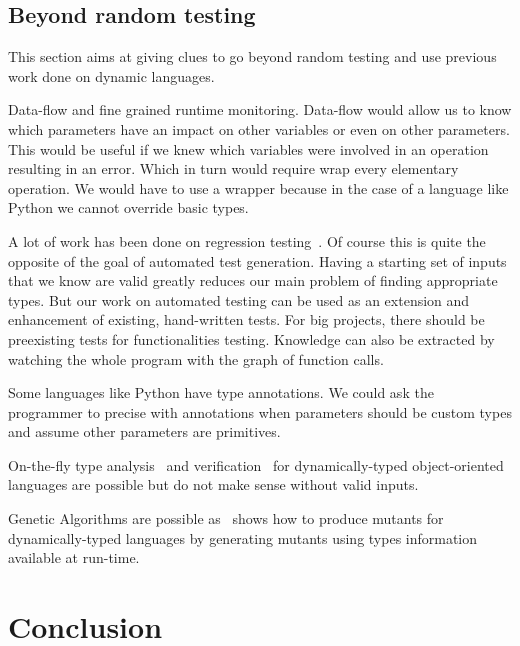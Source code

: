 \documentclass{llncs2e/llncs}
\begin{document}

\subsection{Beyond random testing}

This section aims at giving clues to go beyond random testing and use previous
work done on dynamic languages.

Data-flow and fine grained runtime monitoring. Data-flow would allow us to know
which parameters have an impact on other variables or even on other parameters.
This would be useful if we knew which variables were involved in an operation
resulting in an error. Which in turn would require wrap every elementary
operation. We would have to use a wrapper because in the case of a language like
Python we cannot override basic types.

A lot of work has been done on regression
testing~\cite{gligoric2011smutant,haupt2011type,steinert2010continuous,yoo2012regression}.
Of course this is quite the opposite of the goal of automated test generation.
Having a starting set of inputs that we know are valid greatly reduces our main
problem of finding appropriate types. But our work on automated testing can be
used as an extension and enhancement of existing, hand-written tests.
For big projects, there should be preexisting tests for functionalities testing.
Knowledge can also be extracted by watching the whole program with the graph of
function calls.

Some languages like Python have type annotations. We could ask the programmer to
precise with annotations when parameters should be custom types and assume other
parameters are primitives.

On-the-fly type analysis~\cite{chambers1991iterative} and
verification~\cite{chugh2012nested} for dynamically-typed object-oriented
languages are possible but do not make sense without valid inputs.

Genetic Algorithms are possible as~\cite{bottaci2010type} shows how to produce
mutants for dynamically-typed languages by generating mutants using types
information available at run-time.


\section{Conclusion}
\label{conclusion}
\end{document}
